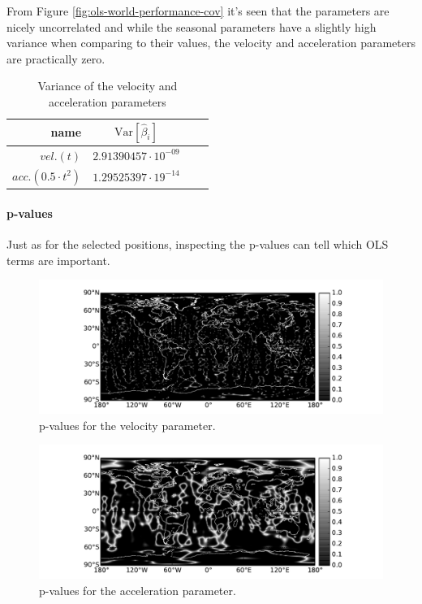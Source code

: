 From Figure \ref{fig:ols-world-performance-cov} it's seen that the parameters are nicely uncorrelated and while the seasonal parameters have a slightly high variance when comparing to their values, the velocity and acceleration parameters are practically zero.
\begin{table}[H]
\centering
\begin{tabular}{r|c c c}
	name & $\mathrm{Var}[\hat{\beta}_i]$ \\ \hline
	$vel. (t)$ & $2.91390457 \cdot 10^{-09}$  \\
	$acc. (0.5 \cdot t^2)$ & $1.29525397 \cdot 19^{-14}$
\end{tabular}
\caption{Variance of the velocity and acceleration parameters}
\end{table}

\paragraph{p-values} Just as for the selected positions, inspecting the p-values can tell which OLS terms are important.

\begin{figure}[H]
	\centering
	\includegraphics[width=\textwidth]{figures/ols-world-diagnostics-pvalue-1}
	\caption{p-values for the velocity parameter.}
	\label{fig:ols-world-diagnostics-pvalue-1}
\end{figure}

\begin{figure}[H]
	\centering
	\includegraphics[width=\textwidth]{figures/ols-world-diagnostics-pvalue-2}
	\caption{p-values for the acceleration parameter.}
	\label{fig:ols-world-diagnostics-pvalue-2}
\end{figure}


